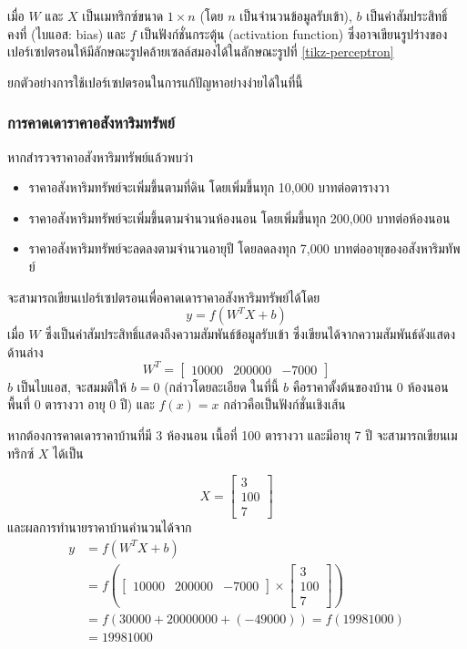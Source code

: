 \documentclass{cpereport}
\begin{document}
เมื่อ $W$ และ $X$ เป็นเมทริกซ์ขนาด $1 \times n$ (โดย $n$ เป็นจำนวนข้อมูลรับเข้า), $b$ เป็นค่าสัมประสิทธิ์คงที่ (ไบแอส: bias)
และ $f$ เป็นฟังก์ชั่นกระตุ้น (activation function) ซึ่งอาจเขียนรูปร่างของเปอร์เซปตรอนให้มีลักษณะรูปคล้ายเซลล์สมองได้ในลักษณะรูปที่ \ref{tikz-perceptron}

ยกตัวอย่างการใช้เปอร์เซปตรอนในการแก้ปัญหาอย่างง่ายได้ในที่นี้

\subsubsection{การคาดเดาราคาอสังหาริมทรัพย์}
หากสำรวจราคาอสังหาริมทรัพย์แล้วพบว่า
\begin{itemize}
    \item ราคาอสังหาริมทรัพย์จะเพิ่มขึ้นตามที่ดิน โดยเพิ่มขึ้นทุก 10,000 บาทต่อตารางวา
    \item ราคาอสังหาริมทรัพย์จะเพิ่มขึ้นตามจำนวนห้องนอน โดยเพิ่มขึ้นทุก 200,000 บาทต่อห้องนอน
    \item ราคาอสังหาริมทรัพย์จะลดลงตามจำนวนอายุปี โดยลดลงทุก 7,000 บาทต่ออายุของอสังหาริมทัพย์
\end{itemize}
\noindent
จะสามารถเขียนเปอร์เซปตรอนเพื่อคาดเดาราคาอสังหาริมทรัพย์ได้โดย
$$ y = f\left(W^TX+b\right) $$
เมื่อ $W$ ซึ่งเป็นค่าสัมประสิทธิ์แสดงถึงความสัมพันธ์ข้อมูลรับเข้า ซึ่งเขียนได้จากความสัมพันธ์ดังแสดงด้านล่าง
$$
    W^T = \begin{bmatrix}
        10000 & 200000 & -7000
    \end{bmatrix}
$$
$b$ เป็นไบแอส, จะสมมติให้ $b = 0$ (กล่าวโดยละเอียด ในที่นี้ $b$ คือราคาตั้งต้นของบ้าน 0 ห้องนอน พื้นที่ 0 ตารางวา อายุ 0 ปี) และ $f(x) = x$ กล่าวคือเป็นฟังก์ชั่นเชิงเส้น

หากต้องการคาดเดาราคาบ้านที่มี 3 ห้องนอน เนื้อที่ 100 ตารางวา และมีอายุ 7 ปี จะสามารถเขียนเมทริกซ์ $X$ ได้เป็น

$$
    X = \begin{bmatrix}
        3 \\
        100 \\
        7
    \end{bmatrix}
$$
และผลการทำนายราคาบ้านคำนวนได้จาก
$$
    \begin{aligned}
        y &= f\left(W^TX+b\right)\\
        &= f\left(\begin{bmatrix}
            10000 & 200000 & -7000
        \end{bmatrix} \times \begin{bmatrix}
            3 \\
            100 \\
            7
        \end{bmatrix}\right)\\
        &= f(30000 + 20000000 + (-49000)) = f(19981000)\\
        &= 19981000
    \end{aligned}
$$
\end{document}

